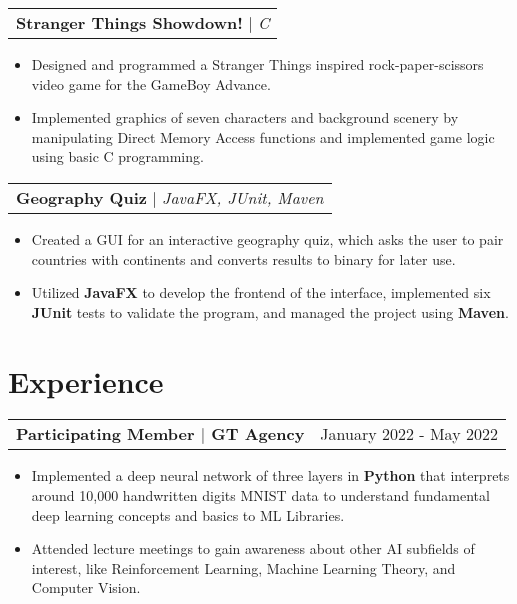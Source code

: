 \documentclass[letterpaper,11pt]{article}
\makeatletter
\newcommand{\resumeExperienceHeading}[2]{
    \begin{tabular*}{0.99\textwidth}[t]{l@{\extracolsep{\fill}}r}
      \textbf{#1} & #2 \\
    \end{tabular*}\vspace{-4pt}
}
\newcommand{\resumeProjectHeading}[2]{
    \begin{tabular*}{0.97\textwidth}[t]{l@{\extracolsep{\fill}}}
      \textbf{#1} $\vert$ \textit{#2} 
    \end{tabular*}\vspace{-4pt}
}
\newcommand{\resumeItemListStart}{\begin{itemize}[noitemsep]\vspace{-4pt}}
\newcommand{\resumeItemListEnd}{\end{itemize}}
\makeatother
\begin{document}
    \resumeProjectHeading{Stranger Things Showdown!}{C}
      \resumeItemListStart
        \item {Designed and programmed a Stranger Things inspired rock-paper-scissors video game for the GameBoy Advance.}
        \item {Implemented graphics of seven characters and background scenery by manipulating Direct Memory Access functions and implemented game logic using basic C programming.}
      \resumeItemListEnd

    \resumeProjectHeading{Geography Quiz}{JavaFX, JUnit, Maven}
      \resumeItemListStart
        \item {Created a GUI for an interactive geography quiz, which asks the user to pair countries with continents and converts results to binary for later use.}
        \item {Utilized \textbf{JavaFX} to develop the frontend of the interface, implemented six \textbf{JUnit} tests to validate the program, and managed the project using \textbf{Maven}.}
      \resumeItemListEnd

\section{Experience}
  \resumeExperienceHeading
    {Participating Member $\vert$ GT Agency}{January 2022 - May 2022}
    \resumeItemListStart 
      \item {Implemented a deep neural network of three layers in \textbf{Python} that interprets around 10,000 handwritten digits MNIST data to understand 
      fundamental deep learning concepts and basics to ML Libraries.}
      \item {Attended lecture meetings to gain awareness about other AI subfields of interest, like Reinforcement Learning,
      Machine Learning Theory, and Computer Vision.}
    \resumeItemListEnd
\end{document}
